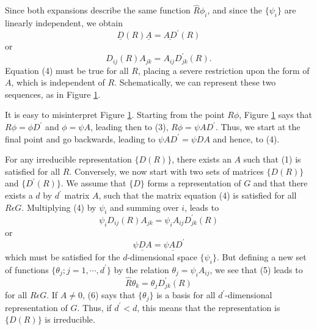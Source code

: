 Since both expansions describe the same function ${\hat{R}}\phi_i$, and 
since the $\{\psi_i\}$ are linearly independent, we obtain
\begin{equation}
\underline{D} (R) \underline{A} = \underline{AD}^{\prime} (R)
\label{chap16app-eqno4a}
\end{equation}
or
\begin{equation}
D_{ij}(R) A_{jk} = A_{ij} D^{\prime}_{jk}(R).
\label{chap16app-eqno4b}
\end{equation}
Equation (4) must be true for all $R$, placing a severe restriction 
upon the form of $A$, which is independent of $R$.  Schematically, we 
can represent these two sequences, as in Figure \ref{chap16app-fig1}.

\begin{figure}
\caption{}
\label{chap16app-fig1}
\end{figure}

It is easy to misinterpret Figure \ref{chap16app-fig1}.  Starting from
the point $R\phi$, Figure \ref{chap16app-fig1} says that $R \phi =
\phi D^{\prime}$ and $\phi = \psi A$, leading then to (3), $R \phi =
\psi AD^{\prime}$.  Thus, we start at the final point and go
backwards, leading to $\psi AD^{\prime} = \psi DA$ and hence, to (4).

For any irreducible representation $\{D(R)\}$, there exists an $A$ 
such that (1) is satisfied for all $R$.  Conversely, we now start with 
two sets of matrices $\{D(R)\}$ and $\{D^{\prime}(R)\}$.  We assume 
that $\{D\}$ forms a representation of $G$ and that there exists a 
$d$ by $d^{\prime}$ matrix $A$, such that the matrix equation (4) is 
satisfied for all $R \epsilon G$.  Multiplying (4) by $\psi_i$ and 
summing over $i$, leads to
\begin{equation}
\psi_i D_{ij}(R)A_{jk} = \psi_i A_{ij} D^{\prime}_{jk} (R)
\label{chap16app-eqno5a}
\end{equation}
or
\begin{equation}
\underline{\psi DA} = \underline{\psi AD}^{\prime}
\label{chap16app-eqno5b}
\end{equation}
which must be satisfied for the $d$-dimensional space $\{\psi_i\}$.  
But defining a new set of functions $\{\theta_j;j=1,\cdots 
,d^{\prime}\}$ by the relation $\theta_j = \psi_iA_{ij}$, we see 
that (5) leads to
\begin{equation}
{\hat{R}} \theta_k = \theta_j D^{\prime}_{jk}(R)
\label{chap16app-eqno6}
\end{equation}
for all $R \epsilon G$.  If $A \not= 0$, (6) says that $\{\theta_j\}$ 
is a basis for all $d^{\prime}$-dimensional representation of $G$.  
Thus, if $d^{\prime} < d$, this means that the representation is 
$\{D(R)\}$ is irreducible.

